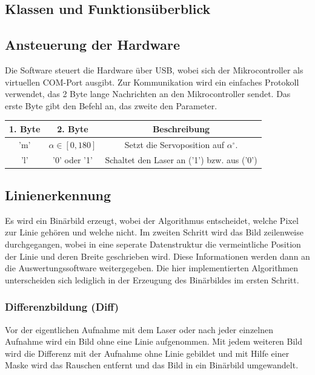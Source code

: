 \documentclass[ngerman,a4paper,parskip=half]{scrartcl}
\begin{document}
\subsection{Klassen und Funktionsüberblick}

\subsection{Ansteuerung der Hardware}

Die Software steuert die Hardware über USB, wobei sich der Mikrocontroller als virtuellen COM-Port ausgibt. Zur Kommunikation wird ein einfaches Protokoll verwendet, das 2 Byte lange Nachrichten an den Mikrocontroller sendet. Das erste Byte gibt den Befehl an, das zweite den Parameter.\\

\begin{tabular}{|c|c|c|}
\hline
1. Byte & 2. Byte & Beschreibung \\
\hline
'm'\footnotemark & $\alpha \in [0,180]$ & Setzt die Servoposition auf $\alpha ^\circ$.\\
\hline
'l' & '0' oder '1' & Schaltet den Laser an ('1') bzw. aus ('0')\\
\hline
\end{tabular}



\subsection{Linienerkennung}

Es wird ein Binärbild erzeugt, wobei der Algorithmus entscheidet, welche Pixel zur Linie gehören und welche nicht. Im zweiten Schritt wird das Bild zeilenweise durchgegangen, wobei in eine seperate Datenstruktur die vermeintliche Position der Linie und deren Breite geschrieben wird. Diese Informationen werden dann an die Auswertungssoftware weitergegeben. Die hier implementierten Algorithmen unterscheiden sich lediglich in der Erzeugung des Binärbildes im ersten Schritt.

\subsubsection{Differenzbildung (Diff)}

Vor der eigentlichen Aufnahme mit dem Laser oder nach jeder einzelnen Aufnahme wird ein Bild ohne eine Linie aufgenommen. Mit jedem weiteren Bild wird die Differenz mit der Aufnahme ohne Linie gebildet und mit Hilfe einer Maske wird das Rauschen entfernt und das Bild in ein Binärbild umgewandelt.
\end{document}
